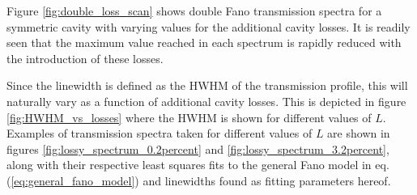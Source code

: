 Figure \ref{fig:double_loss_scan} shows double Fano transmission spectra for a symmetric cavity with varying values for the additional cavity losses. It is readily seen that the maximum value reached in each spectrum is rapidly reduced with the introduction of these losses. 

Since the linewidth is defined as the HWHM of the transmission profile, this will naturally vary as a function of additional cavity losses. This is depicted in figure \ref{fig:HWHM_vs_losses} where the HWHM is shown for different values of $L$. Examples of transmission spectra taken for different values of $L$ are shown in figures \ref{fig:lossy_spectrum_0.2percent} and \ref{fig:lossy_spectrum_3.2percent}, along with their respective least squares fits to the general Fano model in eq. (\ref{eq:general_fano_model}) and linewidths found as fitting parameters hereof. 

